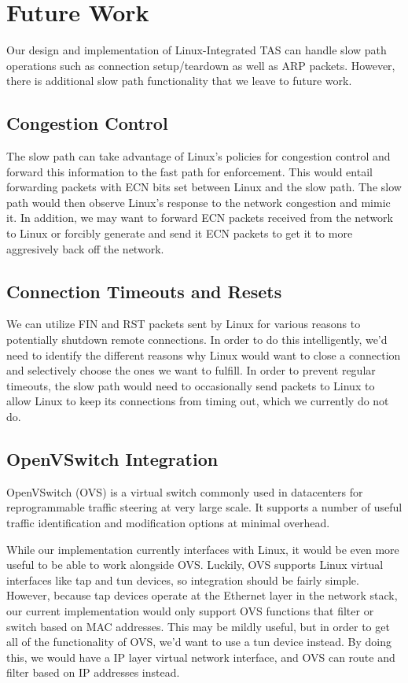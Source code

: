\section{Future Work}\label{Future}

Our design and implementation of Linux-Integrated TAS can handle slow path
operations such as connection setup/teardown as well as ARP packets. However,
there is additional slow path functionality that we leave to future work.

\subsection{Congestion Control}
The slow path can take advantage of Linux's policies for congestion control
and forward this information to the fast path for enforcement. This would entail
forwarding packets with ECN bits set between Linux and the slow path. The slow
path would then observe Linux's response to the network congestion and mimic
it. In addition, we may want to forward ECN packets received from the network to
Linux or forcibly generate and send it ECN packets to get it to more aggresively
back off the network. 

\subsection{Connection Timeouts and Resets}

We can utilize FIN and RST packets sent by Linux for various reasons to 
potentially shutdown remote connections. In order to do this intelligently, we'd
need to identify the different reasons why Linux would want to close a 
connection and selectively choose the ones we want to fulfill. In order to 
prevent regular timeouts, the slow path would need to occasionally send packets 
to Linux to allow Linux to keep its connections from timing out, which we 
currently do not do. 

\subsection{OpenVSwitch Integration}

OpenVSwitch\cite{openvswitch} (OVS) is a virtual switch commonly used in 
datacenters for reprogrammable traffic steering at very large scale. It supports
a number of useful traffic identification and modification options at minimal 
overhead. 

While our implementation currently interfaces with Linux, it would be even more
useful to be able to work alongside OVS. Luckily, OVS supports Linux virtual 
interfaces like tap and tun devices, so integration should be fairly simple. 
However, because tap devices operate at the Ethernet layer in the network stack,
our current implementation would only support OVS functions that filter or 
switch based on MAC addresses. This may be mildly useful, but in order to get 
all of the functionality of OVS, we'd want to use a tun device instead. By doing
this, we would have a IP layer virtual network interface, and OVS can route and 
filter based on IP addresses instead.
